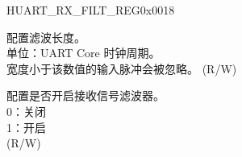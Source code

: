 \begin{register}{H}{UART\_RX\_FILT\_REG}{0x0018}\label{regdesc:UARTRXFILTREG}
%
%
%
\regnewline%
\begin{regdesc}\begin{reglist}
\label{fielddesc:UARTGLITCHFILT}\item [UART\_GLITCH\_FILT] 配置滤波长度。\\单位：UART Core 时钟周期。\\宽度小于该数值的输入脉冲会被忽略。 (R/W)
\label{fielddesc:UARTGLITCHFILTEN}\item [UART\_GLITCH\_FILT\_EN] 配置是否开启接收信号滤波器。\\
0：关闭\\
1：开启\\ (R/W)
\end{reglist}\end{regdesc}
\end{register}


